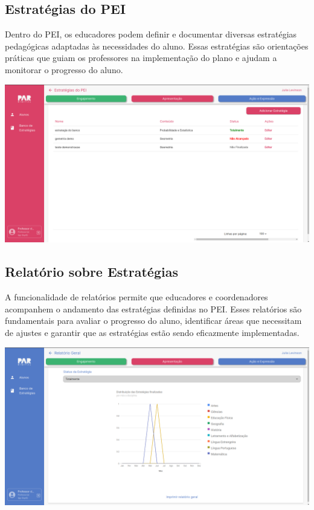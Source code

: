\documentclass[sigconf]{webmedia}
\begin{document}
\subsection{Estratégias do PEI}
Dentro do PEI, os educadores podem definir e documentar diversas 
estratégias pedagógicas adaptadas às necessidades do aluno. Essas 
estratégias são orientações práticas que guiam os professores na 
implementação do plano e ajudam a monitorar o progresso do aluno.
\vspace{0.5cm}

\includegraphics[scale=0.12]{./imgs/estrategia}

\subsection{Relatório sobre Estratégias}
A funcionalidade de relatórios permite que educadores e coordenadores 
acompanhem o andamento das estratégias definidas no PEI. 
Esses relatórios são fundamentais para avaliar o progresso do aluno, 
identificar áreas que necessitam de ajustes e garantir que as 
estratégias estão sendo eficazmente implementadas.
\vspace{0.5cm}

\includegraphics[scale=0.12]{./imgs/relatorio}
\end{document}

